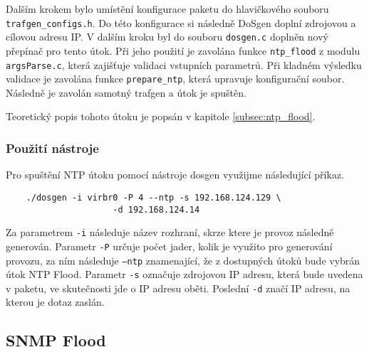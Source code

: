 Dalším krokem bylo umístění konfigurace paketu do hlavičkového souboru \newline \texttt{trafgen\_configs.h}. Do této konfigurace si následně DoSgen doplní zdrojovou a cílovou adresu IP. 
V dalším kroku byl do souboru \texttt{dosgen.c} doplněn nový přepínač pro tento útok. Při jeho použití je zavolána funkce \texttt{ntp\_flood} z modulu \texttt{argsParse.c}, která zajišťuje validaci vstupních parametrů. Při kladném výsledku validace je zavolána funkce \texttt{prepare\_ntp}, která upravuje konfigurační soubor. Následně je zavolán samotný trafgen a útok je spuštěn.

Teoretický popis tohoto útoku je popsán v kapitole \ref{subsec:ntp_flood}.


\subsubsection{Použití nástroje}
Pro spuštění NTP útoku pomocí nástroje dosgen využijme následující příkaz.
\begin{lstlisting}
	./dosgen -i virbr0 -P 4 --ntp -s 192.168.124.129 \
                     -d 192.168.124.14
\end{lstlisting}

Za parametrem \texttt{-i} následuje název rozhraní, skrze ktere je provoz následně generován. Parametr \texttt{-P} určuje počet jader, kolik je využito pro generování provozu, za ním následuje \texttt{--ntp} znamenající, že z dostupných útoků bude vybrán útok NTP Flood. Parametr \texttt{-s} označuje zdrojovou IP adresu, která bude uvedena v paketu, ve skutečnosti jde o IP adresu oběti. Poslední \texttt{-d} značí IP adresu, na kterou je dotaz zaslán.

\subsection{SNMP Flood}